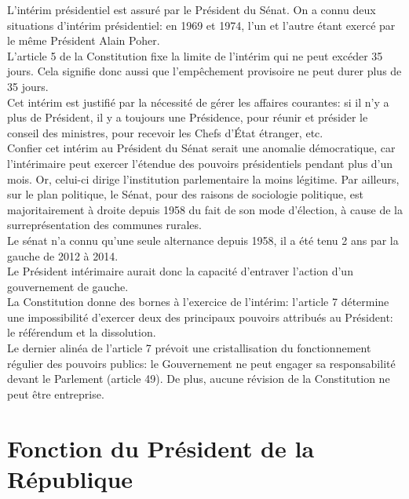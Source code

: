 \documentclass[12pt, a4paper, openany]{book}
\begin{document}
L'intérim présidentiel est assuré par le Président du Sénat. On a connu deux situations d'intérim présidentiel: en 1969 et 1974, l'un et l'autre étant exercé par le même Président Alain Poher. \\
L'article 5 de la Constitution fixe la limite de l'intérim qui ne peut excéder 35 jours. Cela signifie donc aussi que l'empêchement provisoire ne peut durer plus de 35 jours. \\
Cet intérim est justifié par la nécessité de gérer les affaires courantes: si il n'y a plus de Président, il y a toujours une Présidence, pour réunir et présider le conseil des ministres, pour recevoir les Chefs d'État étranger, etc. \\
Confier cet intérim au Président du Sénat serait une anomalie démocratique, car l'intérimaire peut exercer l'étendue des pouvoirs présidentiels pendant plus d'un mois. Or, celui-ci dirige l'institution parlementaire la moins légitime. Par ailleurs, sur le plan politique, le Sénat, pour des raisons de sociologie politique, est majoritairement à droite depuis 1958 du fait de son mode d'élection, à cause de la surreprésentation des communes rurales. \\
Le sénat n'a connu qu'une seule alternance depuis 1958, il a été tenu 2 ans par la gauche de 2012 à 2014. \\
Le Président intérimaire aurait donc la capacité d'entraver l'action d'un gouvernement de gauche. \\
La Constitution donne des bornes à l'exercice de l'intérim: l'article 7 détermine une impossibilité d'exercer deux des principaux pouvoirs attribués au Président: le référendum et la dissolution. \\
Le dernier alinéa de l'article 7 prévoit une cristallisation du fonctionnement régulier des pouvoirs publics: le Gouvernement ne peut engager sa responsabilité devant le Parlement (article 49). De plus, aucune révision de la Constitution ne peut être entreprise. 




\section{Fonction du Président de la République}
\end{document}
